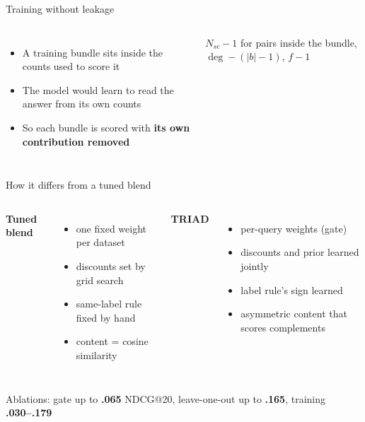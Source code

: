 \documentclass[aspectratio=169,11pt]{beamer}
\begin{document}
\begin{frame}{Training without leakage}
\begin{columns}[c]
\begin{itemize}
\item A training bundle sits inside the counts used to score it
\item The model would learn to \alert{read the answer} from its own counts
\item So each bundle is scored with \textbf{its own contribution removed}
\end{itemize}
\vspace{2mm}
{\small $N_{sc}-1$ for pairs inside the bundle, $\deg-(|b|-1)$, $f-1$}
\centering
{}
\end{columns}
\end{frame}

\begin{frame}{How it differs from a tuned blend}
\begin{columns}[T]
\textbf{Tuned blend}
\begin{itemize}\small
\item one fixed weight per dataset
\item discounts set by grid search
\item same-label rule fixed by hand
\item content = cosine similarity
\end{itemize}
\textbf{TRIAD}
\begin{itemize}\small
\item \alert{per-query} weights (gate)
\item discounts and prior \alert{learned jointly}
\item label rule's \alert{sign learned}
\item asymmetric content that scores \alert{complements}
\end{itemize}
\end{columns}
\vfill
\centering\small Ablations: gate up to \textbf{.065} NDCG@20, leave-one-out up to \textbf{.165}, training \textbf{.030--.179}
\end{frame}
\end{document}
